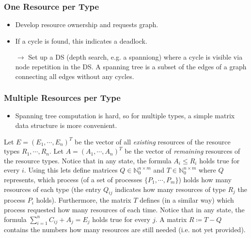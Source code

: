 \documentclass[a4paper, 11pt, accentcolor = tud3b]{tudreport}
\begin{document}
                \subsubsection{One Resource per Type}
                    \begin{itemize}
                    	\item Develop resource ownership and requests graph.
                    	\item If a cycle is found, this indicates a deadlock.
                    	\item[\(\rightarrow\)] Set up a DS (depth search, e.g. a spanniong) where a cycle is visible via node repetition in the DS. A spanning tree is a subset of the edges of a graph connecting all edges without any cycles.
                    \end{itemize}

                \subsubsection{Multiple Resources per Type}
	                \label{sec:deadlockdetection}
                
	                \begin{itemize}
	                	\item Spanning tree computation is hard, so for multiple types, a simple matrix data structure is more convenient.
	                \end{itemize}
                
	                Let \( E = (E_1, \cdots, E_n)^T \) be the vector of all \textit{existing} resources of the resource types \( R_1, \cdots, R_n \). Let \( A = (A_1, \cdots, A_n)^T \) be the vector of \textit{remaining} resources of the resource types. Notice that in any state, the formula \( A_i \leq R_i \) holds true for every \(i\). Using this lets define matrices \( Q \in \mathbb{N}_0^{n \times m} \) and \( T \in \mathbb{N}_0^{n \times m} \) where \(Q\) represents, which process (of a set of processes \( \{ P_1, \cdots, P_m \} \)) holds how many resources of each type (the entry \( Q_{ij} \) indicates how many resources of type \( R_j \) the process \( P_i \) holds). Furthermore, the matrix \(T\) defines (in a similar way) which process requested how many resources of each time. Notice that in any state, the formula \( \sum_{i = 1}^{n} C_{ij} + A_j = E_j \) holds true for every \(j\). A matrix \( R \coloneqq T - Q \) contains the numbers how many resources are still needed (i.e. not yet provided).
	                
\end{document}
